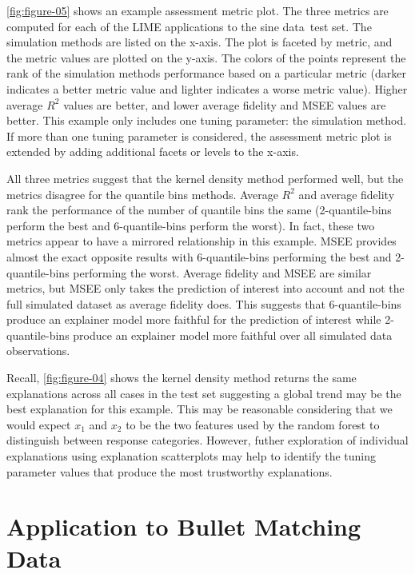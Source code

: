\documentclass[AMS,STIX2COL]{WileyNJD-v2}\usepackage[]{graphicx}\usepackage[]{color}
\newcommand{\data}{sine data}
\begin{document}
\autoref{fig:figure-05} shows an example assessment metric plot. The three metrics are computed for each of the LIME applications to the \data \ test set. The simulation methods are listed on the x-axis. The plot is faceted by metric, and the metric values are plotted on the y-axis. The colors of the points represent the rank of the simulation methods performance based on a particular metric (darker indicates a better metric value and lighter indicates a worse metric value). Higher average $R^2$ values are better, and lower average fidelity and MSEE values are better. This example only includes one tuning parameter: the simulation method. If more than one tuning parameter is considered, the assessment metric plot is extended by adding additional facets or levels to the x-axis.

All three metrics suggest that the kernel density method performed well, but the metrics disagree for the quantile bins methods. Average $R^2$ and average fidelity rank the performance of the number of quantile bins the same (2-quantile-bins perform the best and 6-quantile-bins perform the worst). In fact, these two metrics appear to have a mirrored relationship in this example. MSEE provides almost the exact opposite results with 6-quantile-bins performing the best and 2-quantile-bins performing the worst. Average fidelity and MSEE are similar metrics, but  MSEE only takes the prediction of interest into account and not the full simulated dataset as average fidelity does. This suggests that 6-quantile-bins produce an explainer model more faithful for the prediction of interest while 2-quantile-bins produce an explainer model more faithful over all simulated data observations. 

Recall,  \autoref{fig:figure-04} shows  the kernel density method returns the same explanations  across all cases in the test set suggesting a global trend may be the best explanation for this example. This may be reasonable considering that we would expect  $x_1$ and $x_2$ to be  the two features  used by the random forest to distinguish between response categories. However, futher exploration of individual explanations using explanation scatterplots may help to identify the tuning parameter values that produce the most trustworthy explanations.

\section{Application to Bullet Matching Data} \label{application}
\end{document}
